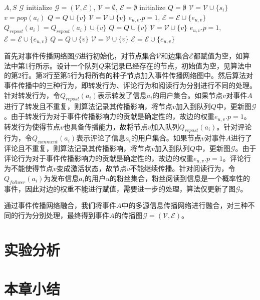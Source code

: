 \begin{algorithm}[!ht]
    \caption{$Merge(A,S)$}
    \label{alg:affairDiff}
    \begin{algorithmic}[1]
	\REQUIRE $A,S$
    \ENSURE $\mathcal{G}$
    \STATE initialize $\mathcal{G}=\left(\mathcal{V},\mathcal{E}\right)$, $\mathcal{V}=\emptyset$, $\mathcal{E}=\emptyset$
    \STATE initialize $Q = \emptyset$
    		\STATE $\mathcal{V} = \mathcal{V} \cup \{s_i\}$
    	\ENDFOR
    		\STATE $v = pop\left(a_i\right)$
    					\STATE $Q = Q \cup \{v\}$
    					\STATE $\mathcal{V} = \mathcal{V} \cup \{v\}$
    					\STATE $e_{u,v}.p = 1$, $\mathcal{E} = \mathcal{E} \cup \{e_{u,v}\}$
    					\STATE $Q_{repost}\left(a_i\right)=Q_{repost}\left(a_i\right) \cup \{v\}$		
    				\ENDWHILE
    			\ENDIF
    				\STATE $Q = Q \cup \{v\}$
    				\STATE $\mathcal{V} = \mathcal{V} \cup \{v\}$
    				\STATE $e_{u,v}.p = 1$, $\mathcal{E} = \mathcal{E} \cup \{e_{u,v}\}$
    			\ENDIF
    				\STATE $Q = Q \cup \{v\}$
    				\STATE $\mathcal{V} = \mathcal{V} \cup \{v\}$
    				\STATE $\mathcal{E} = \mathcal{E} \cup \{e_{u,v}\}$
    			\ENDIF
    		\ENDIF
    	\ENDFOR
    \end{algorithmic}
\end{algorithm}

首先对事件传播网络图$\mathcal{G}$进行初始化，对节点集合$\mathcal{V}$和边集合$\mathcal{E}$都赋值为空，如算法中第1行所示。设计一个队列$Q$来记录已经存在的节点，初始值为空，见算法中的第2行。第3行至第5行为将所有的种子节点加入事件传播网络图中。然后算法对事件传播中的三种行为，即转发行为、评论行为和阅读行为分别进行不同的处理。针对转发行为，令$Q_{repost}\left(a_i\right)$表示转发了信息$a_i$的用户集合。如果节点$v$对事件$A$进行了转发且不重复，则算法记录其传播影响，将节点$v$加入到队列$Q$中，更新图$\mathcal{G}$。由于转发行为对于事件传播影响力的贡献是确定性的，故边的权重$e_{u,v}.p = 1$。转发行为使得节点$v$也具备传播能力，故将节点$v$加入队列$Q_{repost}\left(a_i\right)$。针对评论行为，令$Q_{comment}\left(a_i\right)$表示评论了信息$a_i$的用户集合。如果节点$v$对事件$A$进行了评论且不重复，则算法记录其传播影响，将节点$v$加入到队列$Q$中，更新图$\mathcal{G}$。由于评论行为对于事件传播影响力的贡献是确定性的，故边的权重$e_{u,v}.p = 1$。评论行为不能使得节点$v$变成激活状态，故节点$v$不能继续传播。针对阅读行为，令$Q_{follwer}\left(a_i\right)$为发布信息$a_i$的用户$u$的粉丝集合，粉丝阅读到信息是一个概率性的事件，因此对边的权重不能进行赋值，需要进一步的处理，算法仅更新了图$\mathcal{G}$。

通过事件传播网络融合，我们将事件$A$中的多源信息传播网络进行融合，对三种不同的行为分别处理，最终得到事件$A$的传播图$\mathcal{G}=\left(\mathcal{V},\mathcal{E}\right)$。
\section{实验分析}
\label{sec5:experiment}

\section{本章小结}
\label{sec5:conclusion}